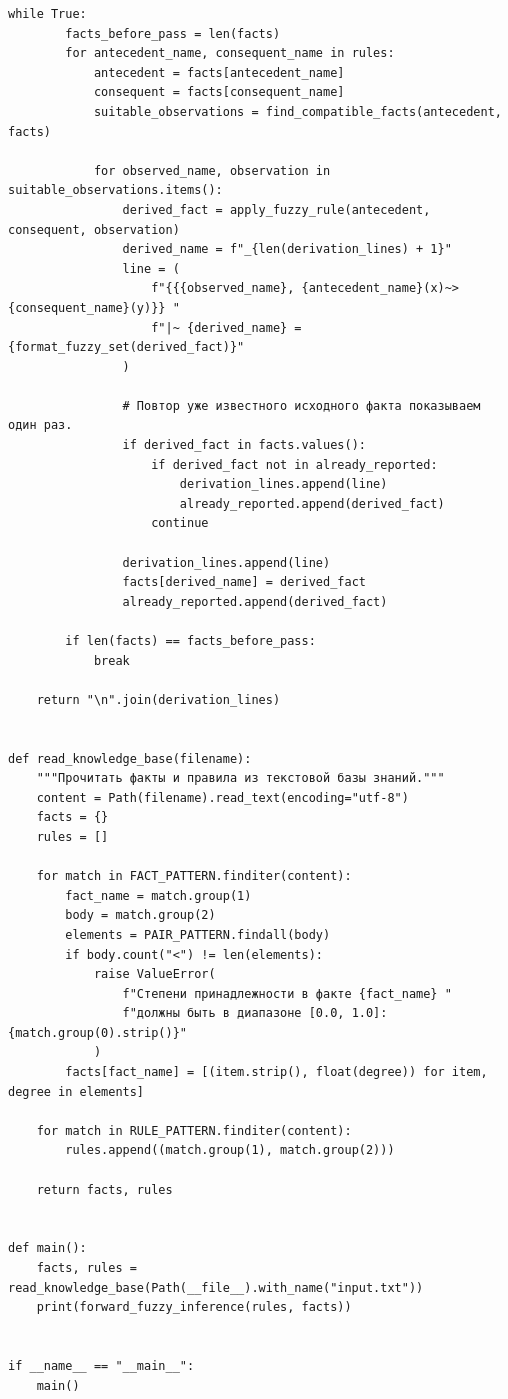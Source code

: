 \documentclass[14pt,a4paper]{extarticle}
\begin{document}
\begin{Verbatim}[fontsize=\small,frame=single,breaklines=true]
    while True:
        facts_before_pass = len(facts)
        for antecedent_name, consequent_name in rules:
            antecedent = facts[antecedent_name]
            consequent = facts[consequent_name]
            suitable_observations = find_compatible_facts(antecedent, facts)

            for observed_name, observation in suitable_observations.items():
                derived_fact = apply_fuzzy_rule(antecedent, consequent, observation)
                derived_name = f"_{len(derivation_lines) + 1}"
                line = (
                    f"{{{observed_name}, {antecedent_name}(x)~>{consequent_name}(y)}} "
                    f"|~ {derived_name} = {format_fuzzy_set(derived_fact)}"
                )

                # Повтор уже известного исходного факта показываем один раз.
                if derived_fact in facts.values():
                    if derived_fact not in already_reported:
                        derivation_lines.append(line)
                        already_reported.append(derived_fact)
                    continue

                derivation_lines.append(line)
                facts[derived_name] = derived_fact
                already_reported.append(derived_fact)

        if len(facts) == facts_before_pass:
            break

    return "\n".join(derivation_lines)


def read_knowledge_base(filename):
    """Прочитать факты и правила из текстовой базы знаний."""
    content = Path(filename).read_text(encoding="utf-8")
    facts = {}
    rules = []

    for match in FACT_PATTERN.finditer(content):
        fact_name = match.group(1)
        body = match.group(2)
        elements = PAIR_PATTERN.findall(body)
        if body.count("<") != len(elements):
            raise ValueError(
                f"Степени принадлежности в факте {fact_name} "
                f"должны быть в диапазоне [0.0, 1.0]: {match.group(0).strip()}"
            )
        facts[fact_name] = [(item.strip(), float(degree)) for item, degree in elements]

    for match in RULE_PATTERN.finditer(content):
        rules.append((match.group(1), match.group(2)))

    return facts, rules


def main():
    facts, rules = read_knowledge_base(Path(__file__).with_name("input.txt"))
    print(forward_fuzzy_inference(rules, facts))


if __name__ == "__main__":
    main()
  \end{Verbatim}
\end{document}
